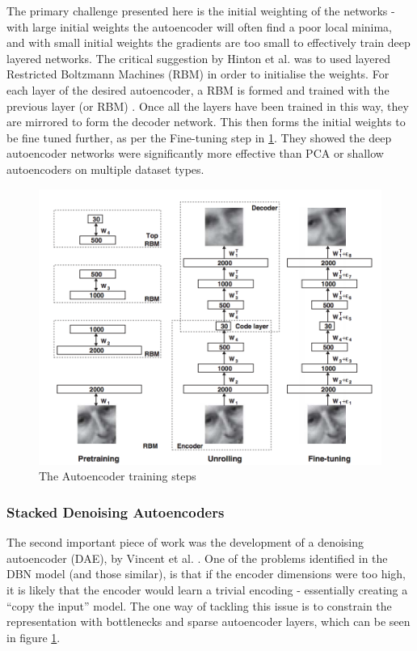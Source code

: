 \documentclass[a4paper,latin]{paper}
\begin{document}
The primary challenge presented here is the initial weighting of the networks - with large initial weights the 
autoencoder will often find a poor local minima, and with small initial weights the gradients are too small to 
effectively train deep layered networks. The critical suggestion by Hinton et al. was to used layered Restricted 
Boltzmann Machines (RBM) in order to initialise the weights. For each layer of the desired autoencoder, a RBM is 
formed and trained with the previous layer (or RBM) \cite{Hinton3}. Once all the layers have been 
trained in this way, they are mirrored to form the decoder network. This then forms the initial weights to be fine 
tuned further, as per the Fine-tuning step in \ref{figure-DBN-RBM}. They showed the deep autoencoder networks were significantly more 
effective than PCA or shallow autoencoders on multiple dataset types. 
 \hfill \break 
 
\begin{figure}
\centering \includegraphics[scale=0.5]{images/DBN-RBM-process.png}
 \caption{The Autoencoder training steps \cite{Hinton2}}
 \label{figure-DBN-RBM}
 \end{figure}
 
\subsubsection {Stacked Denoising Autoencoders}\label{lr_SDAE}

 The second important piece of work was the development of a denoising autoencoder (DAE), by Vincent  et al. \cite{Vincent}. 
 One of the problems identified in the DBN model (and those similar), is that if the encoder dimensions were too high, 
 it is likely that the encoder would learn a trivial encoding - essentially creating a “copy the input” model. The one way
  of tackling this issue is to constrain the representation with bottlenecks and sparse autoencoder layers, which can be seen in figure  \ref{figure-DBN-RBM}.
  \hfill \break 
\end{document}
